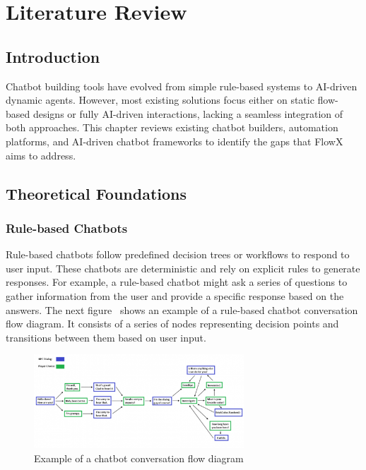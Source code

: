 \chapter{Literature Review}
\label{chap:literature_review}

\section{Introduction}
Chatbot building tools have evolved from simple rule-based systems to AI-driven dynamic agents. However, most existing solutions focus either on static flow-based designs or fully AI-driven interactions, lacking a seamless integration of both approaches. This chapter reviews existing chatbot builders, automation platforms, and AI-driven chatbot frameworks to identify the gaps that FlowX aims to address.

\section{Theoretical Foundations}

\subsection{Rule-based Chatbots}

Rule-based chatbots follow predefined decision trees or workflows to respond to user input. These chatbots are deterministic and rely on explicit rules to generate responses. For example, a rule-based chatbot might ask a series of questions to gather information from the user and provide a specific response based on the answers. The next figure~\cite{medium_image} shows an example of a rule-based chatbot conversation flow diagram. It consists of a series of nodes representing decision points and transitions between them based on user input.
\begin{figure}[ht]
    \centering
    \includegraphics[width=0.7\textwidth]{assets/ChatbotConversationFlowExample.png}
    \caption{Example of a chatbot conversation flow diagram}
    \label{fig:chatbot_flow}
\end{figure}

